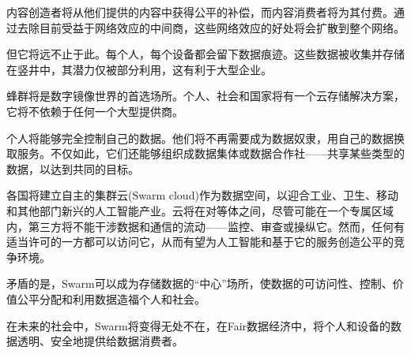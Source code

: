 内容创造者将从他们提供的内容中获得公平的补偿，而内容消费者将为其付费。通过去除目前受益于网络效应的中间商，这些网络效应的好处将会扩散到整个网络。

但它将远不止于此。每个人，每个设备都会留下数据痕迹。这些数据被收集并存储在竖井中，其潜力仅被部分利用，这有利于大型企业。

蜂群将是数字镜像世界的首选场所。个人、社会和国家将有一个云存储解决方案，它将不依赖于任何一个大型提供商。 


个人将能够完全控制自己的数据。他们将不再需要成为数据奴隶，用自己的数据换取服务。不仅如此，它们还能够组织成数据集体或数据合作社——共享某些类型的数据，以达到共同的目标。

各国将建立自主的集群云(Swarm cloud)作为数据空间，以迎合工业、卫生、移动和其他部门新兴的人工智能产业。云将在对等体之间，尽管可能在一个专属区域内，第三方将不能干涉数据和通信的流动——监控、审查或操纵它。然而，任何有适当许可的一方都可以访问它，从而有望为人工智能和基于它的服务创造公平的竞争环境。

矛盾的是，Swarm可以成为存储数据的“中心”场所，使数据的可访问性、控制、价值公平分配和利用数据造福个人和社会。

在未来的社会中，Swarm将变得无处不在，在Fair数据经济中，将个人和设备的数据透明、安全地提供给数据消费者。


